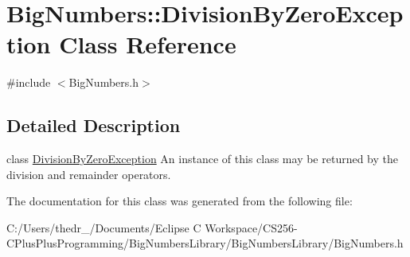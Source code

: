 \hypertarget{class_big_numbers_1_1_division_by_zero_exception}{}\section{Big\+Numbers\+:\+:Division\+By\+Zero\+Exception Class Reference}
\label{class_big_numbers_1_1_division_by_zero_exception}


{\ttfamily \#include $<$Big\+Numbers.\+h$>$}



\subsection{Detailed Description}
class \mbox{\hyperlink{class_big_numbers_1_1_division_by_zero_exception}{Division\+By\+Zero\+Exception}} An instance of this class may be returned by the division and remainder operators. 

The documentation for this class was generated from the following file\+:\begin{DoxyCompactItemize}
\item 
C\+:/\+Users/thedr\+\_/\+Documents/\+Eclipse C Workspace/\+C\+S256-\/\+C\+Plus\+Plus\+Programming/\+Big\+Numbers\+Library/\+Big\+Numbers\+Library/Big\+Numbers.\+h\end{DoxyCompactItemize}
